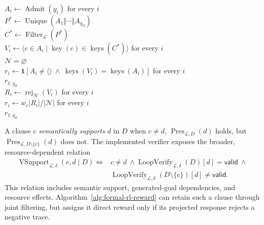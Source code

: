 \begin{algorithm}[H]
\caption{CRAFT reward for one RL group}
\label{alg:formal-rl-reward}
\begin{algorithmic}
\algline \(A_i\leftarrow\operatorname{Admit}(y_i)\) for every \(i\)\\
\algline \(P^*\leftarrow\operatorname{Unique}(A_1\Vert\cdots\Vert
  A_{g_{\mathrm{rl}}})\)\\
\algline \(C^*\leftarrow\operatorname{Filter}_{\mathcal L}(P^*)\)
  \\
\algline \(V_i\leftarrow\langle c\in A_i\mid\operatorname{key}(c)\in
  \operatorname{keys}(C^*)\rangle\) for every \(i\)\\
\algline {} \(\mathcal N=\varnothing\) \\
\algline \algind \(r_i\leftarrow\mathbf 1[A_i\ne\langle\rangle\ \land\
  \operatorname{keys}(V_i)=\operatorname{keys}(A_i)]\) for every \(i\)\\
\algline \algind \kw{return} \(r_{1:g_{\mathrm{rl}}}\)\\
\algline \(R_i\leftarrow\operatorname{rej}_{\mathcal N}(V_i)\) for every \(i\)\\
\algline \(r_i\leftarrow w_c|R_i|/|\mathcal N|\)
  for every \(i\)\\
\algline {} \(r_{1:g_{\mathrm{rl}}}\)\\
\end{algorithmic}
\end{algorithm}

A clause \(c\) \emph{semantically supports} \(d\) in \(D\) when
\(c\ne d\), \(\operatorname{Pres}_{\mathcal L,D}(d)\) holds, but
\(\operatorname{Pres}_{\mathcal L,D\setminus\{c\}}(d)\) does not.  The
implemented verifier exposes the broader, resource-dependent relation
\begin{equation}
\begin{split}
\operatorname{VSupport}_{\mathcal L,\delta}(c,d\mid D)
\iff{}&c\ne d\ \land
\operatorname{LoopVerify}_{\mathcal L,\delta}(D)[d]=\mathsf{valid}\ \land\\
&\operatorname{LoopVerify}_{\mathcal L,\delta}(D\setminus\{c\})[d]
  \ne\mathsf{valid}.
\end{split}
\label{eq:formal-verifier-support}
\end{equation}
This relation includes semantic support, generated-goal dependencies, and
resource effects.  Algorithm~\ref{alg:formal-rl-reward} can retain such a
clause through joint filtering, but assigns it direct reward only if its
projected response rejects a negative trace.


